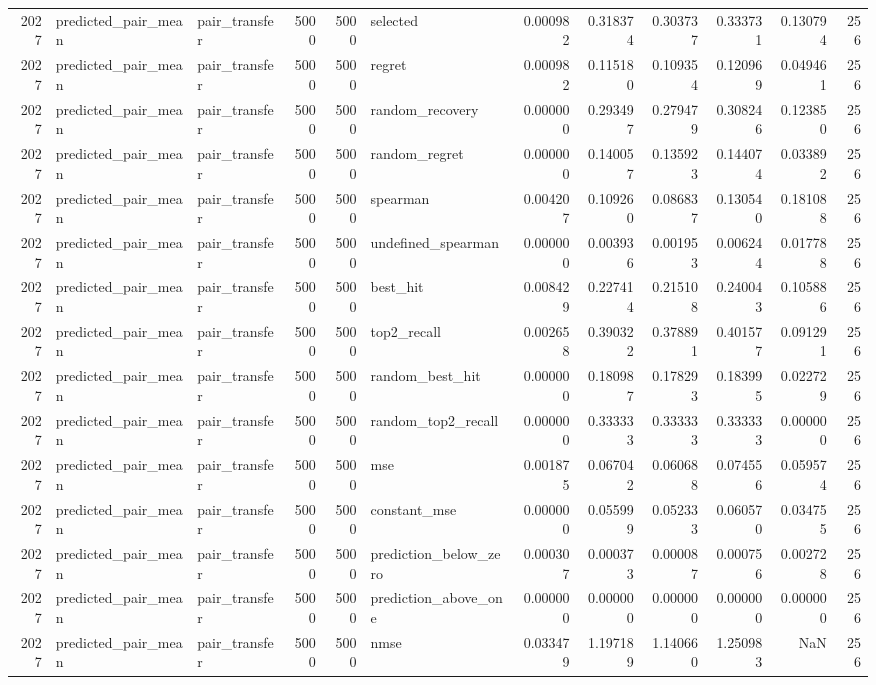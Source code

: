 \begin{tabular}{rllrrlrrrrrr}
2027 & predicted_pair_mean & pair_transfer & 5000 & 5000 & selected & 0.000982 & 0.318374 & 0.303737 & 0.333731 & 0.130794 & 256 \\
2027 & predicted_pair_mean & pair_transfer & 5000 & 5000 & regret & 0.000982 & 0.115180 & 0.109354 & 0.120969 & 0.049461 & 256 \\
2027 & predicted_pair_mean & pair_transfer & 5000 & 5000 & random_recovery & 0.000000 & 0.293497 & 0.279479 & 0.308246 & 0.123850 & 256 \\
2027 & predicted_pair_mean & pair_transfer & 5000 & 5000 & random_regret & 0.000000 & 0.140057 & 0.135923 & 0.144074 & 0.033892 & 256 \\
2027 & predicted_pair_mean & pair_transfer & 5000 & 5000 & spearman & 0.004207 & 0.109260 & 0.086837 & 0.130540 & 0.181088 & 256 \\
2027 & predicted_pair_mean & pair_transfer & 5000 & 5000 & undefined_spearman & 0.000000 & 0.003936 & 0.001953 & 0.006244 & 0.017788 & 256 \\
2027 & predicted_pair_mean & pair_transfer & 5000 & 5000 & best_hit & 0.008429 & 0.227414 & 0.215108 & 0.240043 & 0.105886 & 256 \\
2027 & predicted_pair_mean & pair_transfer & 5000 & 5000 & top2_recall & 0.002658 & 0.390322 & 0.378891 & 0.401577 & 0.091291 & 256 \\
2027 & predicted_pair_mean & pair_transfer & 5000 & 5000 & random_best_hit & 0.000000 & 0.180987 & 0.178293 & 0.183995 & 0.022729 & 256 \\
2027 & predicted_pair_mean & pair_transfer & 5000 & 5000 & random_top2_recall & 0.000000 & 0.333333 & 0.333333 & 0.333333 & 0.000000 & 256 \\
2027 & predicted_pair_mean & pair_transfer & 5000 & 5000 & mse & 0.001875 & 0.067042 & 0.060688 & 0.074556 & 0.059574 & 256 \\
2027 & predicted_pair_mean & pair_transfer & 5000 & 5000 & constant_mse & 0.000000 & 0.055999 & 0.052333 & 0.060570 & 0.034755 & 256 \\
2027 & predicted_pair_mean & pair_transfer & 5000 & 5000 & prediction_below_zero & 0.000307 & 0.000373 & 0.000087 & 0.000756 & 0.002728 & 256 \\
2027 & predicted_pair_mean & pair_transfer & 5000 & 5000 & prediction_above_one & 0.000000 & 0.000000 & 0.000000 & 0.000000 & 0.000000 & 256 \\
2027 & predicted_pair_mean & pair_transfer & 5000 & 5000 & nmse & 0.033479 & 1.197189 & 1.140660 & 1.250983 & NaN & 256 \\

\end{tabular}
